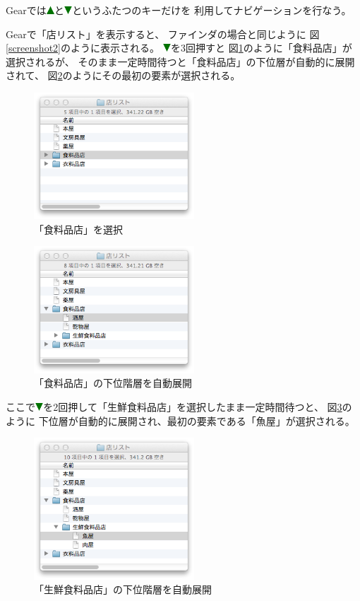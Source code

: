\documentclass[twoside]{wiss}
\def\GEAR{\textsf{Gear}}
\def\uptriangle{\includegraphics[width=3mm,bb=0 0 36 36]{figures/uptriangle.pdf}}
\def\downtriangle{\includegraphics[width=3mm,bb=0 0 36 36]{figures/downtriangle.pdf}}
\begin{document}
{\GEAR}では{\uptriangle}と{\downtriangle}というふたつのキーだけを
利用してナビゲーションを行なう。

{\GEAR}で「店リスト」を表示すると、
ファインダの場合と同じように
図\ref{screenshot2}のように表示される。
{\downtriangle}を3回押すと
図\ref{screenshot42}のように「食料品店」が選択されるが、
そのまま一定時間待つと「食料品店」の下位層が自動的に展開されて、
図\ref{screenshot7}のようにその最初の要素が選択される。

\begin{figure}[H]
\centerline{\includegraphics[width=60mm,bb=0 0 344 272]{figures/c074cd6daec3da0341125d1492b8a09c.png}}
\caption{「食料品店」を選択}
\label{screenshot42}
\end{figure}

\begin{figure}[H]
\centerline{\includegraphics[width=60mm,bb=0 0 344 272]{figures/2387e402f81dbe7917e04df82b0a659c.png}}
\caption{「食料品店」の下位階層を自動展開}
\label{screenshot7}
\end{figure}

\noindent
ここで{\downtriangle}を2回押して「生鮮食料品店」を選択したまま一定時間待つと、
図\ref{screenshot8}のように
下位層が自動的に展開され、最初の要素である「魚屋」が選択される。

\begin{figure}[H]
\centerline{\includegraphics[width=60mm,bb=0 0 344 304]{figures/1b1955309d3baefda8e1b614cf06df62.png}}
\caption{「生鮮食料品店」の下位階層を自動展開}
\label{screenshot8}
\end{figure}
\end{document}

